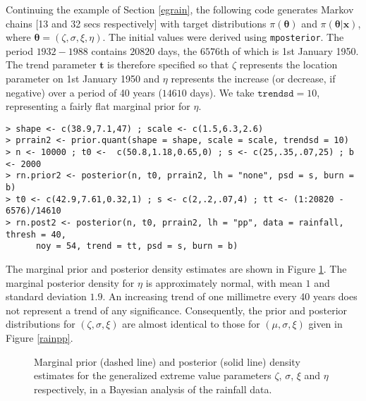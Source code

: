 \documentclass[11pt,a4paper]{article}
\newcommand{\bs}{\boldsymbol}
\begin{document}
Continuing the example of Section \ref{egrain}, the following code
generates Markov chains [13 and 32 secs respectively] with target
distributions $\pi(\bs{\theta})$ and $\pi(\bs{\theta}|\bs{x})$, where
$\bs{\theta} = (\zeta,\sigma,\xi,\eta)$.  The initial values were
derived using \verb+mposterior+.  The period $1932-1988$ contains
$20820$ days, the $6576$th of which is 1st January 1950.  The trend
parameter $\bs{t}$ is therefore specified so that $\zeta$ represents
the location parameter on 1st January 1950 and $\eta$ represents the
increase (or decrease, if negative) over a period of 40 years ($14610$
days).  We take $\texttt{trendsd} = 10$, representing a fairly flat
marginal prior for $\eta$.

\begin{verbatim}
> shape <- c(38.9,7.1,47) ; scale <- c(1.5,6.3,2.6)
> prrain2 <- prior.quant(shape = shape, scale = scale, trendsd = 10)
> n <- 10000 ; t0 <-  c(50.8,1.18,0.65,0) ; s <- c(25,.35,.07,25) ; b <- 2000
> rn.prior2 <- posterior(n, t0, prrain2, lh = "none", psd = s, burn = b)
> t0 <- c(42.9,7.61,0.32,1) ; s <- c(2,.2,.07,4) ; tt <- (1:20820 - 6576)/14610
> rn.post2 <- posterior(n, t0, prrain2, lh = "pp", data = rainfall, thresh = 40, 
      noy = 54, trend = tt, psd = s, burn = b)
\end{verbatim}

The marginal prior and posterior density estimates are shown in Figure
\ref{trdens}.  The marginal posterior density for $\eta$ is
approximately normal, with mean $1$ and standard deviation $1.9$.  An
increasing trend of one millimetre every 40 years does not represent a
trend of any significance.  Consequently, the prior and posterior
distributions for $(\zeta,\sigma,\xi)$ are almost identical to those
for $(\mu,\sigma,\xi)$ given in Figure \ref{rainpp}.

\begin{figure}
\begin{center}
   \vspace{-1.5cm}
  \hspace{-0.5cm} 
  \hspace{-0.5cm} 
  \hspace{-0.5cm} 
\end{center}
\caption{Marginal prior (dashed line) and posterior (solid line)
  density estimates for the generalized extreme value parameters
  $\zeta$, $\sigma$, $\xi$ and $\eta$ respectively, in a Bayesian
  analysis of the rainfall data.}
\label{trdens}
\end{figure}
\end{document}
